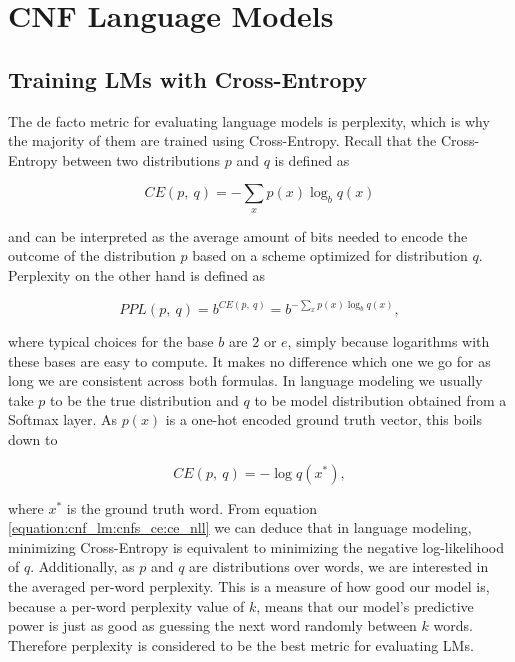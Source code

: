 \section{CNF Language Models}
\label{section:cnf_lm:cnfs_ce}

\subsection{Training LMs with Cross-Entropy}

The de facto metric for evaluating language models is perplexity, which is why the majority of them are trained using Cross-Entropy. Recall that the Cross-Entropy between two distributions $ p $ and $ q $ is defined as

\begin{displaymath}
    CE(p, \ q) = - \sum_x p(x) \log_b q(x)
\end{displaymath}

and can be interpreted as the average amount of bits needed to encode the outcome of the distribution $ p $ based on a scheme optimized for distribution $ q $. Perplexity on the other hand is defined as

\begin{displaymath}
    PPL(p, \ q) = b^{CE(p, \ q)} = b^{- \sum_x p(x) \log_b q(x)},
\end{displaymath}

where typical choices for the base $ b $ are $ 2 $ or $ e $, simply because logarithms with these bases are easy to compute. It makes no difference which one we go for as long we are consistent across both formulas. In language modeling we usually take $ p $ to be the true distribution and $ q $ to be model distribution obtained from a Softmax layer. As $ p(x) $ is a one-hot encoded ground truth vector, this boils down to

\begin{equation}
    \label{equation:cnf_lm:cnfs_ce:ce_nll}
    CE(p, \ q) = - \log q(x^*),
\end{equation}
    
where $ x^* $ is the ground truth word. From equation \ref{equation:cnf_lm:cnfs_ce:ce_nll} we can deduce that in language modeling, minimizing Cross-Entropy is equivalent to minimizing the negative log-likelihood of $ q $. Additionally, as $ p $ and $ q $ are distributions over words, we are interested in the averaged per-word perplexity. This is a measure of how good our model is, because a per-word perplexity value of $ k $, means that our model's predictive power is just as good as guessing the next word randomly between $ k $ words. Therefore perplexity is considered to be the best metric for evaluating LMs.

